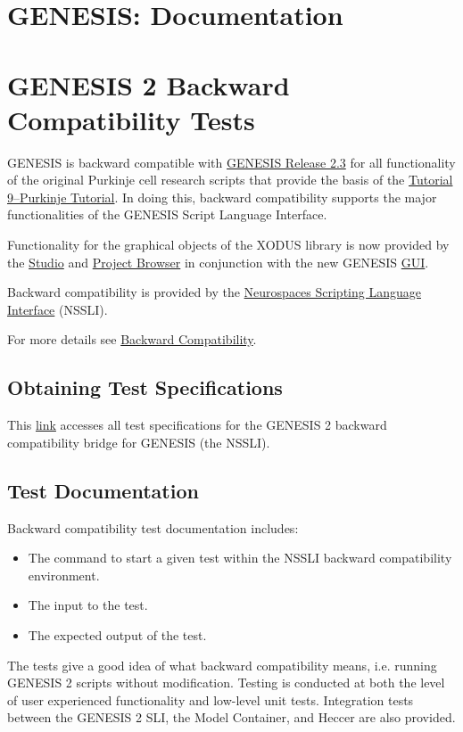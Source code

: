 \documentclass[12pt]{article}
\begin{document}
\section*{GENESIS: Documentation}

\section*{GENESIS 2 Backward Compatibility Tests}

GENESIS is backward compatible with \href{http://genesis-sim.org/GENESIS/genesis-ftp/}{GENESIS Release 2.3} for all functionality of the original Purkinje cell research scripts that provide the basis of the \href{http://genesis-sim.org/GENESIS/illtuts/purkinje.html}{Tutorial 9--Purkinje Tutorial}. In doing this, backward compatibility supports the major functionalities of the GENESIS Script Language Interface.

Functionality for the graphical objects of the XODUS library is now provided by the \href{../studio/studio.tex}{Studio} and \href{../project-browser/project-browser.tex}{Project Browser} in conjunction with the new GENESIS \href{../gui/gui.tex}{GUI}.

Backward compatibility is provided by the \href{../nssli/nssli.tex}{Neurospaces Scripting Language Interface} (NSSLI).

For more details see \href{../backward-compatibility}{Backward Compatibility}.

\subsection*{Obtaining Test Specifications}

This \href{http://neurospaces.sourceforge.net/neurospaces_project/ns-sli/tests/html/index.html}{link} accesses all test specifications for the GENESIS 2 backward compatibility bridge for GENESIS (the NSSLI).

\subsection*{Test Documentation}

Backward compatibility test documentation includes:
\begin{itemize}
\item The command to start a given test within the NSSLI backward compatibility environment.
\item The input to the test.
\item The expected output of the test.
\end{itemize}
The tests give a good idea of what backward compatibility means, i.e. running GENESIS 2 scripts without modification. Testing is conducted at both the level of user experienced functionality and low-level unit tests. Integration tests between the GENESIS 2 SLI, the Model Container, and Heccer are also provided.
\end{document}
